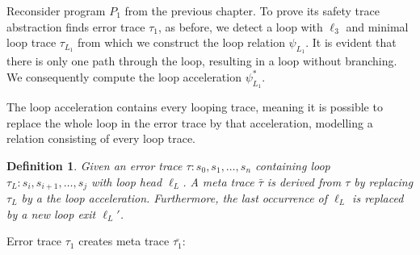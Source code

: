 \documentclass{article}
\newtheorem{mydef}{Definition}
\begin{document}
Reconsider program $P_1$ from the previous chapter. To prove its safety trace abstraction finds error trace $\tau_1$, as before, we detect a loop with  $\ell_3$ and minimal loop trace $\tau_{L_1}$ from which we construct the loop relation $\psi_{L_1}$. It is evident that there is only one path through the loop, resulting in a loop without branching. We consequently compute the loop acceleration $\psi^*_{L_1}$. \par

The loop acceleration contains every looping trace, meaning it is possible to replace the whole loop in the error trace by that acceleration, modelling a relation consisting of every loop trace.

\begin{mydef}
	Given an error trace $\tau: s_0, s_1, \ldots, s_n$ containing loop $\tau_L: s_i, s_{i+1}, \ldots, s_j$ with loop head $\ell_L$. A meta trace $\bar{\tau}$ is derived from $\tau$ by replacing $\tau_L$ by a the loop acceleration. Furthermore, the last occurrence of $\ell_L$ is replaced by a new loop exit $\ell_L'$.
\end{mydef}

Error trace $\tau_1$ creates meta trace $\bar{\tau_1}$:


\begin{figure}[H]
\end{figure}
\end{document}
